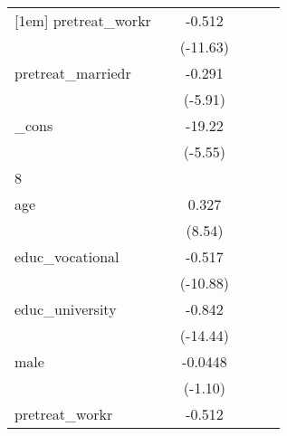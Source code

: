 {\begin{tabular}{l*{5}{c}}
[1em]
pretreat\_workr&                     &      -0.512\sym{***}&                     &                     &                     \\
            &                     &    (-11.63)         &                     &                     &                     \\
[1em]
pretreat\_marriedr&                     &      -0.291\sym{***}&                     &                     &                     \\
            &                     &     (-5.91)         &                     &                     &                     \\
[1em]
\_cons      &                     &      -19.22\sym{***}&                     &                     &                     \\
            &                     &     (-5.55)         &                     &                     &                     \\
\hline
8           &                     &                     &                     &                     &                     \\
age         &                     &       0.327\sym{***}&                     &                     &                     \\
            &                     &      (8.54)         &                     &                     &                     \\
[1em]
educ\_vocational&                     &      -0.517\sym{***}&                     &                     &                     \\
            &                     &    (-10.88)         &                     &                     &                     \\
[1em]
educ\_university&                     &      -0.842\sym{***}&                     &                     &                     \\
            &                     &    (-14.44)         &                     &                     &                     \\
[1em]
male        &                     &     -0.0448         &                     &                     &                     \\
            &                     &     (-1.10)         &                     &                     &                     \\
[1em]
pretreat\_workr&                     &      -0.512\sym{***}&                     &                     &                     \\

\end{tabular}}
